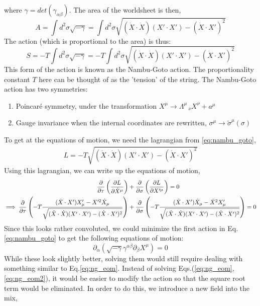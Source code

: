 \documentclass{article}
\providecommand{\brak}[1]{\ensuremath{\left(#1\right)}} %
\begin{document}
where $\gamma = det(\gamma_{\alpha\beta})$. The area of the worldsheet is then,
\begin{equation}
	A = \int d^2\sigma \sqrt{-\gamma} = \int d^2\sigma \sqrt{(\dot{X}\cdot\dot{X})(X'\cdot X') - (\dot{X}\cdot X')^2
}
\end{equation}
The action (which is proportional to the area) is thus:
\begin{equation}
	S = -T\int d^2\sigma \sqrt{-\gamma} = -T\int d^2\sigma \sqrt{(\dot{X}\cdot\dot{X})(X'\cdot X') - (\dot{X}\cdot X')^2}\label{eq:nambu_goto}
\end{equation}
This form of the action is known as the Nambu-Goto action. The proportionality constant $T$ here can be thought of as the 'tension' of the string. The Nambu-Goto action has two symmetries:
\begin{enumerate}
	\item Poincar\'e symmetry, under the transformation $X^\mu \rightarrow \Lambda^\mu\,_\nu X^\nu + a^\mu$
	\item Gauge invariance when the internal coordinates are rewritten, $\sigma^\mu \rightarrow \tilde{\sigma}^\mu(\sigma)$
\end{enumerate}
To get at the equations of motion, we need the lagrangian from \eqref{eq:nambu_goto},
\begin{align}
	L = -T\sqrt{(\dot{X}\cdot\dot{X})(X'\cdot X') - (\dot{X}\cdot X')^2}
\end{align}
Using this lagrangian, we can write up the equations of motion,
\begin{align}
	\pdv{}{\tau}\brak{\pdv{L}{\dot{X}^\mu}}&+\pdv{}{\sigma}\brak{\pdv{L}{X'^\mu}}=0\\
	\implies \pdv{}{\tau}\brak{-T\frac{(\dot{X}\cdot X')X'_\mu-X'^2\dot{X}_\mu}{\sqrt{(\dot{X}\cdot\dot{X})(X'\cdot X') - (\dot{X}\cdot X')^2}}}&+\pdv{}{\sigma}\brak{-T\frac{(\dot{X}\cdot X')\dot{X}_\mu-\dot{X}^2X'_\mu}{\sqrt{(\dot{X}\cdot\dot{X})(X'\cdot X') - (\dot{X}\cdot X')^2}}} =0 \label{eq:ng_eom}
\end{align}
Since this looks rather convoluted, we could minimize the first action in Eq.\eqref{eq:nambu_goto} to get the following equations of motion:
\begin{equation}
	\partial_\alpha\brak{\sqrt{-\gamma}\gamma^{\alpha\beta}\partial_\beta X^\mu} =0\label{eq:ng_eom2}
\end{equation}
While these look slightly better, solving them would still require dealing with something similar to Eq.\eqref{eq:ng_eom}. Instead of solving Eqs.(\ref{eq:ng_eom},\ref{eq:ng_eom2}), it would be easier to modify the action so that the square root term would be eliminated. In order to do this, we introduce a new field into the mix,
\end{document}
